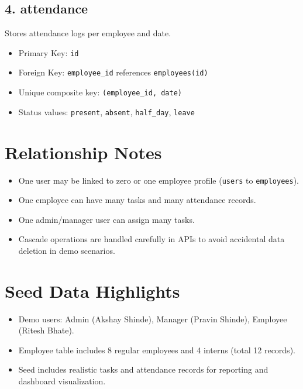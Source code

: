 \subsection*{4. attendance}
Stores attendance logs per employee and date.
\begin{itemize}[leftmargin=1.3cm]
\item Primary Key: \texttt{id}
\item Foreign Key: \texttt{employee\_id} references \texttt{employees(id)}
\item Unique composite key: \texttt{(employee\_id, date)}
\item Status values: \texttt{present}, \texttt{absent}, \texttt{half\_day}, \texttt{leave}
\end{itemize}

\section{Relationship Notes}
\begin{itemize}[leftmargin=1.3cm]
\item One user may be linked to zero or one employee profile (\texttt{users} to \texttt{employees}).
\item One employee can have many tasks and many attendance records.
\item One admin/manager user can assign many tasks.
\item Cascade operations are handled carefully in APIs to avoid accidental data deletion in demo scenarios.
\end{itemize}

\section{Seed Data Highlights}
\begin{itemize}[leftmargin=1.3cm]
\item Demo users: Admin (Akshay Shinde), Manager (Pravin Shinde), Employee (Ritesh Bhate).
\item Employee table includes 8 regular employees and 4 interns (total 12 records).
\item Seed includes realistic tasks and attendance records for reporting and dashboard visualization.
\end{itemize}
